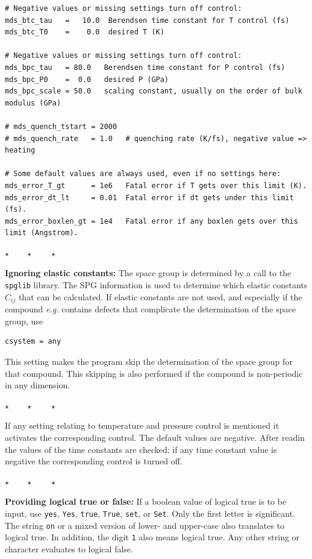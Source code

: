 \documentclass[a4paper,12pt,pdftex,onecolumn]{article}
\newcommand{\eg}{\emph{e.g.}\xspace}
\newcommand{\stars}{\begin{center}%
\vspace{1em plus 0.5em minus 0.5em}%
$\star \qquad \star \qquad \star$%
\vspace{1em plus 0.5em minus 0.5em}%
\end{center}}
\begin{document}
\begin{Verbatim}[fontsize=\relsize{-1},frame=single]
# Negative values or missing settings turn off control:
mds_btc_tau   =   10.0  Berendsen time constant for T control (fs)
mds_btc_T0    =    0.0  desired T (K)

# Negative values or missing settings turn off control:
mds_bpc_tau   = 80.0   Berendsen time constant for P control (fs)
mds_bpc_P0    =  0.0   desired P (GPa)
mds_bpc_scale = 50.0   scaling constant, usually on the order of bulk modulus (GPa)

# mds_quench_tstart = 2000
# mds_quench_rate   = 1.0   # quenching rate (K/fs), negative value => heating

# Some default values are always used, even if no settings here:
mds_error_T_gt      = 1e6   Fatal error if T gets over this limit (K).
mds_error_dt_lt     = 0.01  Fatal error if dt gets under this limit (fs).
mds_error_boxlen_gt = 1e4   Fatal error if any boxlen gets over this limit (Angstrom).

\end{Verbatim}

\stars

\textbf{Ignoring elastic constants:}
The space group is determined by a call to the \verb+spglib+ library.
The SPG information is used to determine which elastic constants $C_{ij}$ that can be
calculated. If elastic constants are not used, and especially if the compound \eg
contains defects that complicate the determination of the space group, use

\begin{Verbatim}[fontsize=\relsize{-1},frame=single]
csystem = any
\end{Verbatim}

This setting makes the program skip the determination of the space group for that
compound. This skipping is also performed if the compound is non-periodic in any
dimension.


\stars

If any setting relating to temperature and pressure control is mentioned it activates
the corresponding control. The default values are negative.
After readin the values of the time constants are checked; if any time constant value is
negative the corresponding control is turned off.

\stars

\textbf{Providing logical true or false:}
If a boolean value of logical true is to be input, use
\verb+yes+, \verb+Yes+, \verb+true+, \verb+True+, \verb+set+, or \verb+Set+.
Only the first letter is significant. The string \verb+on+
or a mixed version of lower- and upper-case also translates to logical true.
In addition, the digit \verb+1+ also means logical true.
Any other string or character evaluates to logical false.
\end{document}
